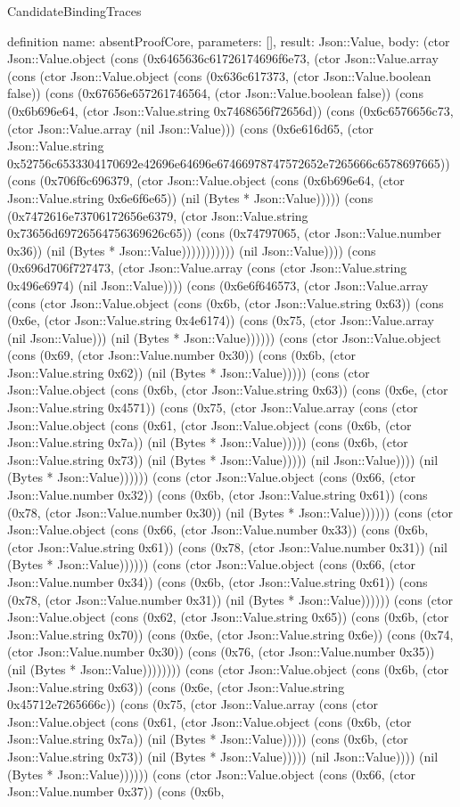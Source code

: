 \begin{lexlean}{CandidateBindingTraces}
\begin{semanticmodule}
definition{
 name: absentProofCore,
 parameters: [],
 result: Json::Value,
 body: (ctor Json::Value.object (cons (0x6465636c61726174696f6e73, (ctor Json::Value.array (cons (ctor Json::Value.object (cons (0x636c617373, (ctor Json::Value.boolean false)) (cons (0x67656e657261746564, (ctor Json::Value.boolean false)) (cons (0x6b696e64, (ctor Json::Value.string 0x7468656f72656d)) (cons (0x6c6576656c73, (ctor Json::Value.array (nil Json::Value))) (cons (0x6e616d65, (ctor Json::Value.string 0x52756c6533304170692e42696e64696e67466978747572652e7265666c6578697665)) (cons (0x706f6c696379, (ctor Json::Value.object (cons (0x6b696e64, (ctor Json::Value.string 0x6e6f6e65)) (nil (Bytes * Json::Value))))) (cons (0x7472616e73706172656e6379, (ctor Json::Value.string 0x73656d69726564756369626c65)) (cons (0x74797065, (ctor Json::Value.number 0x36)) (nil (Bytes * Json::Value))))))))))) (nil Json::Value)))) (cons (0x696d706f727473, (ctor Json::Value.array (cons (ctor Json::Value.string 0x496e6974) (nil Json::Value)))) (cons (0x6e6f646573, (ctor Json::Value.array (cons (ctor Json::Value.object (cons (0x6b, (ctor Json::Value.string 0x63)) (cons (0x6e, (ctor Json::Value.string 0x4e6174)) (cons (0x75, (ctor Json::Value.array (nil Json::Value))) (nil (Bytes * Json::Value)))))) (cons (ctor Json::Value.object (cons (0x69, (ctor Json::Value.number 0x30)) (cons (0x6b, (ctor Json::Value.string 0x62)) (nil (Bytes * Json::Value))))) (cons (ctor Json::Value.object (cons (0x6b, (ctor Json::Value.string 0x63)) (cons (0x6e, (ctor Json::Value.string 0x4571)) (cons (0x75, (ctor Json::Value.array (cons (ctor Json::Value.object (cons (0x61, (ctor Json::Value.object (cons (0x6b, (ctor Json::Value.string 0x7a)) (nil (Bytes * Json::Value))))) (cons (0x6b, (ctor Json::Value.string 0x73)) (nil (Bytes * Json::Value))))) (nil Json::Value)))) (nil (Bytes * Json::Value)))))) (cons (ctor Json::Value.object (cons (0x66, (ctor Json::Value.number 0x32)) (cons (0x6b, (ctor Json::Value.string 0x61)) (cons (0x78, (ctor Json::Value.number 0x30)) (nil (Bytes * Json::Value)))))) (cons (ctor Json::Value.object (cons (0x66, (ctor Json::Value.number 0x33)) (cons (0x6b, (ctor Json::Value.string 0x61)) (cons (0x78, (ctor Json::Value.number 0x31)) (nil (Bytes * Json::Value)))))) (cons (ctor Json::Value.object (cons (0x66, (ctor Json::Value.number 0x34)) (cons (0x6b, (ctor Json::Value.string 0x61)) (cons (0x78, (ctor Json::Value.number 0x31)) (nil (Bytes * Json::Value)))))) (cons (ctor Json::Value.object (cons (0x62, (ctor Json::Value.string 0x65)) (cons (0x6b, (ctor Json::Value.string 0x70)) (cons (0x6e, (ctor Json::Value.string 0x6e)) (cons (0x74, (ctor Json::Value.number 0x30)) (cons (0x76, (ctor Json::Value.number 0x35)) (nil (Bytes * Json::Value)))))))) (cons (ctor Json::Value.object (cons (0x6b, (ctor Json::Value.string 0x63)) (cons (0x6e, (ctor Json::Value.string 0x45712e7265666c)) (cons (0x75, (ctor Json::Value.array (cons (ctor Json::Value.object (cons (0x61, (ctor Json::Value.object (cons (0x6b, (ctor Json::Value.string 0x7a)) (nil (Bytes * Json::Value))))) (cons (0x6b, (ctor Json::Value.string 0x73)) (nil (Bytes * Json::Value))))) (nil Json::Value)))) (nil (Bytes * Json::Value)))))) (cons (ctor Json::Value.object (cons (0x66, (ctor Json::Value.number 0x37)) (cons (0x6b, }
\end{semanticmodule}
\end{lexlean}
